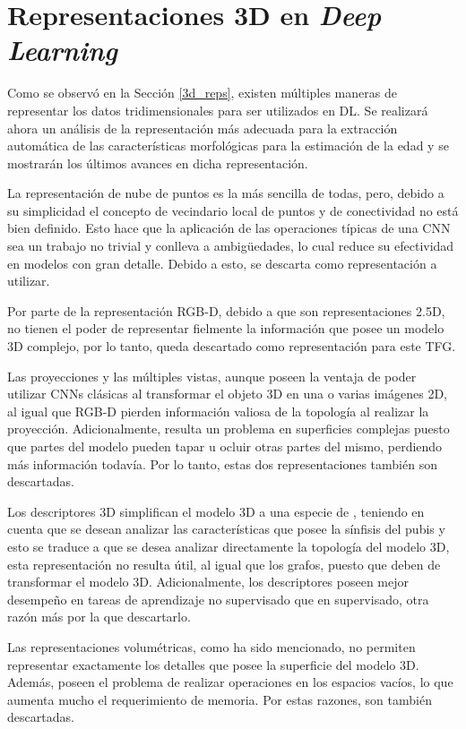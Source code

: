 \section{Representaciones 3D en \textit{Deep Learning}}
Como se observó en la Sección \ref{3d_reps}, existen múltiples maneras de representar los datos tridimensionales para ser utilizados en DL. Se realizará ahora un análisis de la representación más adecuada para la extracción automática de las características morfológicas para la estimación de la edad y se mostrarán los últimos avances en dicha representación.

La representación de nube de puntos es la más sencilla de todas, pero, debido a su simplicidad el concepto de vecindario local de puntos y de conectividad no está bien definido. Esto hace que la aplicación de las operaciones típicas de una CNN sea un trabajo no trivial y conlleva a ambigüedades, lo cual reduce su efectividad en modelos con gran detalle. Debido a esto, se descarta como representación a utilizar.

Por parte de la representación RGB-D, debido a que son representaciones 2.5D, no tienen el poder de representar fielmente la información que posee un modelo 3D complejo, por lo tanto, queda descartado como representación para este TFG.

Las proyecciones y las múltiples vistas, aunque poseen la ventaja de poder utilizar CNNs clásicas al transformar el objeto 3D en una o varias imágenes 2D, al igual que RGB-D pierden información valiosa de la topología al realizar la proyección. Adicionalmente, resulta un problema en superficies complejas puesto que partes del modelo pueden tapar u ocluir otras partes del mismo, perdiendo más información todavía. Por lo tanto, estas dos representaciones también son descartadas.

Los descriptores 3D simplifican el modelo 3D a una especie de , teniendo en cuenta que se desean analizar las características que posee la sínfisis del pubis y esto se traduce a que se desea analizar directamente la topología del modelo 3D, esta representación no resulta útil, al igual que los grafos, puesto que deben de transformar el modelo 3D. Adicionalmente, los descriptores poseen mejor desempeño en tareas de aprendizaje no supervisado que en supervisado, otra razón más por la que descartarlo. 

Las representaciones volumétricas, como ha sido mencionado, no permiten representar exactamente los detalles que posee la superficie del modelo 3D. Además, poseen el problema de realizar operaciones en los espacios vacíos, lo que aumenta mucho el requerimiento de memoria. Por estas razones, son también descartadas.


